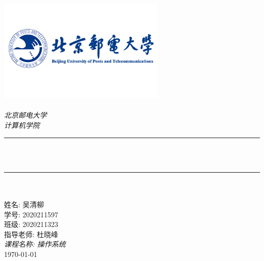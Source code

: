 \begin{titlepage}
	\newcommand{\HRule}{\rule{\linewidth}{0.5mm}}
	\includegraphics[width=8cm]{title/logo_bupt.png}\\[1cm]
	\center
	\quad\\[1.5cm]
	\textsl{\Large 北京邮电大学}\\[0.5cm]
	\textsl{\large  计算机学院}\\[0.5cm]
	\makeatletter
	\HRule \\[0.4cm]
	{\huge \bfseries \@title}\\[0.4cm]
	\HRule \\[0.5cm]

	~\\[1cm] %

	\makeatother
	{\large 姓名: 吴清柳}\\[0.5cm]
	{\large 学号: 2020211597}\\[0.5cm]
	{\large 班级: 2020211323}\\[0.5cm]
	{\large 指导老师: 杜晓峰}\\[0.5cm]
	{\large \emph{课程名称: 操作系统}}\\[0.5cm]
	{\large \today}\\[2cm]
	\vfill
\end{titlepage}
